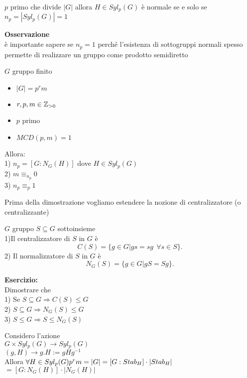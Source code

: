 \documentclass[12px]{article}
\begin{document}
\begin{dimo}
		\begin{coro}
			$p$ primo che divide $|G|$ allora  $H\in Syl_p(G)$ è normale se e solo se\\ $n_p = |Syl_p(G)| = 1$
		\end{coro}
		\textbf{Osservazione}\\
		è importante sapere se $n_p = 1$ perché l'esistenza di sottogruppi normali spesso permette di realizzare un gruppo come prodotto semidiretto
	\\
	\begin{teo}
		$G$ gruppo finito
		\begin{itemize}
			\item $|G| = p^r m$
			\item $r,p,m\in \mathbb{Z}_{>0}$
			\item $p$ primo
			\item $MCD(p,m) = 1$
		\end{itemize}
		Allora:\\
		1) $n_p = [G:N_G(H)]$ dove  $H\in Syl_p(G)$ \\
		2) $m\equiv_{n_p} 0$\\
		3)  $n_p\equiv_p 1$
	\end{teo}
	Prima della dimostrazione vogliamo estendere la nozione di centralizzatore (o centralizzante)
	\newpage
	\begin{defi}[Normalizzatore]
		$G$ gruppo $S\subseteq G$ sottoinsieme\\
		1)Il centralizzatore di  $S$ in  $G$ è
		 \[
			 C(S) = \{g\in G| gs = sg \ \ \forall s\in S\}
		.\] 
		2) Il normalizzatore di $S$ in $G$ è 
		\[
			N_G(S) = \{g\in G | gS = Sg\}
		.\] 
	\end{defi}
	\textbf{Esercizio:}\\
	Dimostrare che\\
	1) Se $S\subseteq G \Rightarrow C(S) \leq G$ \\
	2) $S\subseteq G \Rightarrow N_G(S)\leq G$ \\
	3) $S\leq G \Rightarrow S\leq N_G(S)$ \\
	\begin{dimo}
		Considero l'azione\\
		$G\times Syl_p(G) \rightarrow Syl_p(G)$\\
		$(g,H) \rightarrow g.H := gHg^{-1}$ \\
		Allora $\forall H\in Syl_p(G)\\
		p^rm = |G| = [G:Stab_H]\cdot |Stab_H|$\\
		 $= [G:N_G(H)]\cdot |N_G(H)|$\hfill

\end{dimo}
\end{dimo}
\end{document}

